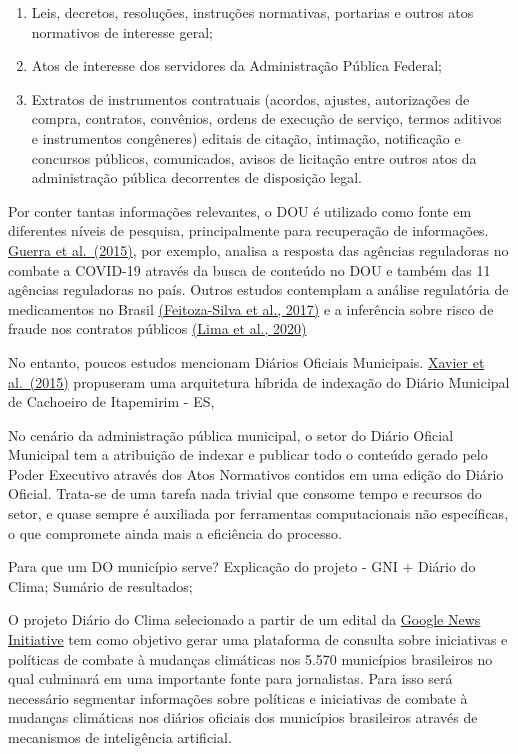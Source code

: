 \documentclass[
]{article}
\providecommand{\tightlist}{%
  \setlength{\itemsep}{0pt}\setlength{\parskip}{0pt}}
\begin{document}
\begin{enumerate}
\def\labelenumi{\arabic{enumi}.}
\tightlist
\item
  Leis, decretos, resoluções, instruções normativas, portarias e outros
  atos normativos de interesse geral;
\item
  Atos de interesse dos servidores da Administração Pública Federal;
\item
  Extratos de instrumentos contratuais (acordos, ajustes, autorizações
  de compra, contratos, convênios, ordens de execução de serviço, termos
  aditivos e instrumentos congêneres) editais de citação, intimação,
  notificação e concursos públicos, comunicados, avisos de licitação
  entre outros atos da administração pública decorrentes de disposição
  legal.
\end{enumerate}

Por conter tantas informações relevantes, o DOU é utilizado como fonte
em diferentes níveis de pesquisa, principalmente para recuperação de
informações.
\href{https://www.scielo.br/j/rap/a/cXjcx6hgZ4r5XN3t6rd7SSJ/?lang=en}{Guerra
et al.~(2015)}, por exemplo, analisa a resposta das agências reguladoras
no combate a COVID-19 através da busca de conteúdo no DOU e também das
11 agências reguladoras no país. Outros estudos contemplam a análise
regulatória de medicamentos no Brasil
\href{http://dx.doi.org/10.11606/issn.2316-9044.v18i2p122-156}{(Feitoza-Silva
et al., 2017)} e a inferência sobre risco de fraude nos contratos
públicos
\href{https://aclanthology.org/2020.findings-emnlp.143.pdf}{(Lima et
al., 2020)}

No entanto, poucos estudos mencionam Diários Oficiais Municipais.
\href{https://www.scielo.br/j/tinf/a/mJmTKbL94hj89q9p8HfCnLj/?format=pdf\&lang=pt}{Xavier
et al.~(2015)} propuseram uma arquitetura híbrida de indexação do Diário
Municipal de Cachoeiro de Itapemirim - ES,

No cenário da administração pública municipal, o setor do Diário Oficial
Municipal tem a atribuição de indexar e publicar todo o conteúdo gerado
pelo Poder Executivo através dos Atos Normativos contidos em uma edição
do Diário Oficial. Trata-se de uma tarefa nada trivial que consome tempo
e recursos do setor, e quase sempre é auxiliada por ferramentas
computacionais não específicas, o que compromete ainda mais a eficiência
do processo.

Para que um DO município serve? Explicação do projeto - GNI + Diário do
Clima; Sumário de resultados;

O projeto Diário do Clima selecionado a partir de um edital da
\href{https://newsinitiative.withgoogle.com/}{Google News Initiative}
tem como objetivo gerar uma plataforma de consulta sobre iniciativas e
políticas de combate à mudanças climáticas nos 5.570 municípios
brasileiros no qual culminará em uma importante fonte para jornalistas.
Para isso será necessário segmentar informações sobre políticas e
iniciativas de combate à mudanças climáticas nos diários oficiais dos
municípios brasileiros através de mecanismos de inteligência artificial.
\end{document}

